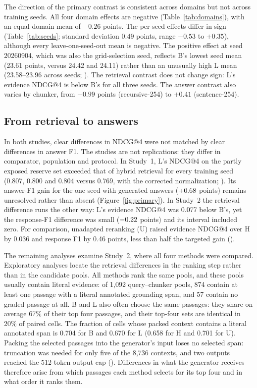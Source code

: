 The direction of the primary contrast is consistent across domains but not across training seeds. All four domain effects are negative (Table~\ref{tab:domains}), with an equal-domain mean of $-0.26$ points. The per-seed effects differ in sign (Table~\ref{tab:seeds}; standard deviation 0.49 points, range $-0.53$ to $+0.35$), although every leave-one-seed-out mean is negative. The positive effect at seed 20260904, which was also the grid-selection seed, reflects B's lowest seed mean (23.61 points, versus 24.42 and 24.11) rather than an unusually high L mean (23.58--23.96 across seeds; ). The retrieval contrast does not change sign: L's evidence NDCG@4 is below B's for all three seeds. The answer contrast also varies by chunker, from $-0.99$ points (recursive-254) to $+0.41$ (\mbox{sentence-254}).



\subsection{From retrieval to answers}\label{sec:propagation}
In both studies, clear differences in NDCG@4 were not matched by clear differences in answer F1. The studies are not replications: they differ in comparator, population and protocol. In Study~1, L's NDCG@4 on the partly exposed reserve set exceeded that of hybrid retrieval for every training seed (0.807, 0.800 and 0.804 versus 0.769, with the corrected normalization; ). Its answer-F1 gain for the one seed with generated answers ($+0.68$ points) remains unresolved rather than absent (Figure~\ref{fig:primary}). In Study~2 the retrieval difference runs the other way: L's evidence NDCG@4 was 0.077 below B's, yet the response-F1 difference was small ($-0.22$ points) and its interval included zero. For comparison, unadapted reranking (U) raised evidence NDCG@4 over H by 0.036 and response F1 by 0.46 points, less than half the targeted gain ().

The remaining analyses examine Study~2, where all four methods were compared. Exploratory analyses locate the retrieval differences in the ranking step rather than in the candidate pools. All methods rank the same pools, and these pools usually contain literal evidence: of 1,092 query--chunker pools, 874 contain at least one passage with a literal annotated grounding span, and 57 contain no graded passage at all. B and L also often choose the same passages: they share on average 67\% of their top four passages, and their top-four sets are identical in 20\% of paired cells. The fraction of cells whose packed context contains a literal annotated span is 0.704 for B and 0.670 for L (0.658 for H and 0.701 for U). Packing the selected passages into the generator's input loses no selected span: truncation was needed for only five of the 8,736 contexts, and two outputs reached the 512-token output cap (). Differences in what the generator receives therefore arise from which passages each method selects for its top four and in what order it ranks them.



